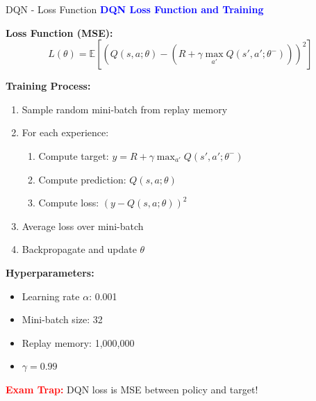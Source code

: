 \documentclass[8pt]{beamer}
\begin{document}
	\begin{frame}{DQN - Loss Function}
		\fontsize{6.5}{7.5}\selectfont
		\textcolor{blue}{\textbf{DQN Loss Function and Training}}
		
		\textbf{Loss Function (MSE):}
		\[
		L(\theta) = \mathbb{E}[(Q(s,a;\theta) - (R + \gamma \max_{a'} Q(s',a';\theta^-)))^2]
		\]
		
		\textbf{Training Process:}
		\begin{enumerate}
			\item Sample random mini-batch from replay memory
			\item For each experience:
			\begin{enumerate}
				\item Compute target: $y = R + \gamma \max_{a'} Q(s',a';\theta^-)$
				\item Compute prediction: $Q(s,a;\theta)$
				\item Compute loss: $(y - Q(s,a;\theta))^2$
			\end{enumerate}
			\item Average loss over mini-batch
			\item Backpropagate and update $\theta$
		\end{enumerate}
		
		\textbf{Hyperparameters:}
		\begin{itemize}
			\item Learning rate $\alpha$: 0.001
			\item Mini-batch size: 32
			\item Replay memory: 1,000,000
			\item $\gamma = 0.99$
		\end{itemize}
		
		\textcolor{red}{\textbf{Exam Trap:}} DQN loss is MSE between policy and target!
	\end{frame}
	
\end{document}
